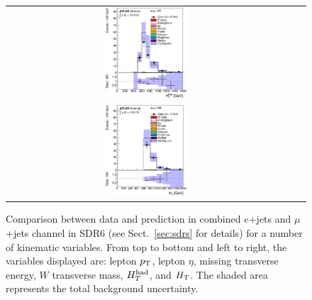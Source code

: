 \begin{figure}[h!]
\begin{center}
\begin{tabular}{ccc}
\includegraphics[width=0.30\textwidth]{appendices/figures/sdrs/HTHad_ELEMUONCR6_1W_NOMINAL.eps}  \\
\includegraphics[width=0.30\textwidth]{appendices/figures/sdrs/HTAll_ELEMUONCR6_1W_NOMINAL.eps}  &  &\\
\end{tabular}\caption{\small {Comparison between data and prediction in combined $e$+jets and $\mu$+jets channel in SDR6 (see Sect.~\ref{sec:sdrs} for details) 
for a number of kinematic variables. From top to bottom and left to right, the variables displayed are: lepton $\pt$, lepton $\eta$, missing transverse energy, $W$ transverse mass,
$\hthad$, and $\HT$. The shaded area represents the total background uncertainty.}}
\label{fig:ELEMUONCR6_1}
\end{center}
\end{figure}                                                                             


